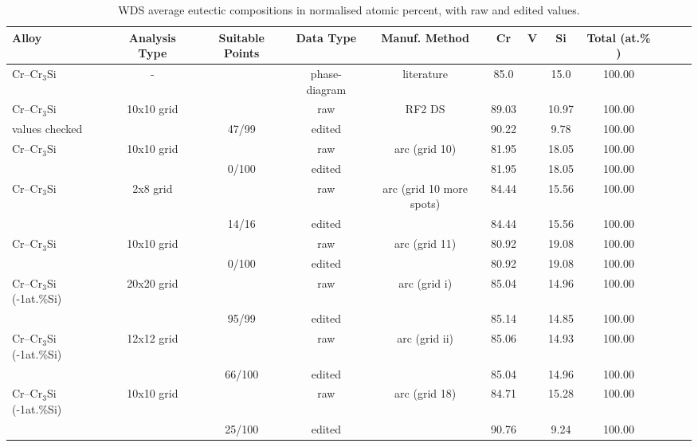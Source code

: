 \begin{landscape}\vspace*{\fill}
\begin{table}[htdp]
\begin{center}
\begin{tabular}{lccccccccccc}
\hline
Alloy 	&  Analysis Type	&Suitable Points	&Data Type & Manuf.  Method	&   Cr    &  V       & Si   		& Total (at.\% ) \\
\hline\hline
Cr--Cr$_3$Si&  		-		&		&phase-diagram	& literature	&85.0		&      	&   15.0    	&100.00\\

Cr--Cr$_3$Si& 10x10 grid 		&		&raw		&	RF2 DS 		&89.03		&		&   10.97		&100.00\\
	values checked&			&47/99	&edited 	&	 			&90.22		&		&   9.78    	&100.00\\

Cr--Cr$_3$Si& 10x10 grid 		&		&raw 	&arc (grid 10)	&	81.95	&		&     18.05  	&100.00\\
			   &				&0/100	&edited 	&			&	81.95	&		&     18.05  	&100.00\\

Cr--Cr$_3$Si& 2x8 grid 			&		&raw		&arc (grid 10 more spots)&84.44		&		&   15.56		&100.00\\
			   &				&14/16	&edited 	&				&84.44		&		&   15.56  	&100.00\\

Cr--Cr$_3$Si& 10x10 grid 		&		&raw 	& arc (grid 11) 		&80.92		&		&   19.08		&100.00\\
			   &				&0/100	& edited 	&	 			&80.92		&		&   19.08  	&100.00\\

Cr--Cr$_3$Si (-1at.\%Si) &20x20 grid& 		&raw		&arc (grid i)	&85.04		&		&   14.96 		&100.00\\
			   &				   &95/99	&edited	& 			&85.14		&		&   14.85  	&100.00\\

Cr--Cr$_3$Si (-1at.\%Si) &12x12 grid &		&raw		&arc (grid ii)	&85.06		&		&   14.93    	&100.00\\
			   &				   &66/100&edited	& 			&85.04		&		&   14.96  	&100.00\\


Cr--Cr$_3$Si (-1at.\%Si) &10x10 grid &		&raw		& arc (grid 18)	&84.71			&		& 15.28    &100.00\\
			   &				   &25/100&edited	& 			&90.76			&		&   9.24  	&100.00\\

\hline
\end{tabular}
\end{center}
\caption{WDS average eutectic compositions in normalised atomic percent, with raw and edited values.}
\label{tab:crati}
\end{table}
\end{landscape}
%

